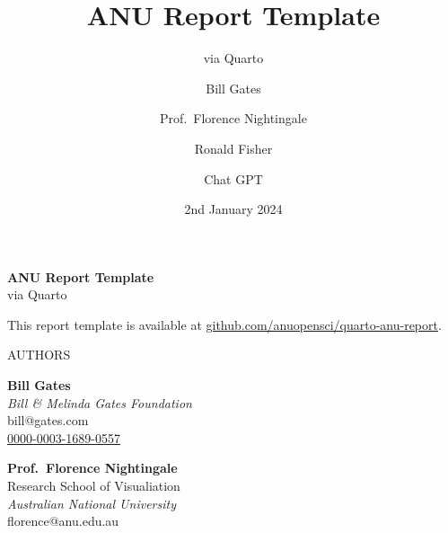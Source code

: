 \documentclass[
  a4paper,
  oneside,
  open=any]{scrbook}
\title{ANU Report Template}
\subtitle{via Quarto}
\author{Bill Gates \and Prof.~Florence Nightingale \and Ronald
Fisher \and Chat GPT}
\date{2nd January 2024}
\newcommand{\orcid}[1]{\href{https://orcid.org/#1}{\textcolor{orcidlogocol}{\faOrcid} #1}}
\begin{document}
  \begin{frontmatter}
  \begin{titlepage}

  \begin{minipage}[b][\textheight][s]{\textwidth}
  \raggedright


  {\Huge\bfseries{ANU Report Template}}\\[1\baselineskip]
  {\LARGE{via Quarto}}\\[1\baselineskip]
    \vspace{3mm}

      This report template is available at
      \href{https://github.com/anuopensci/quarto-anu-report}{github.com/anuopensci/quarto-anu-report}.

  \begin{titlepagebox}



  \textcolor{anugold}{\MakeUppercase{Authors}}
  \vspace{-3mm}
  \begin{multicols}{2}
      \begin{minipage}{\columnwidth}
      \raggedright
      \normalfont
      {\textbf{Bill Gates}}\\
          
      {\itshape{Bill \& Melinda Gates Foundation}}\\
           bill@gates.com\\
      
      \orcid{0000-0003-1689-0557}\\
      \vspace{4mm}
      \end{minipage}

      \begin{minipage}{\columnwidth}
      \raggedright
      \normalfont
      {\textbf{Prof.~Florence Nightingale}}\\
          {Research School of Visualiation}\\
      {\itshape{Australian National University}}\\
           florence@anu.edu.au\\
      

\end{minipage}
\end{multicols}
\end{titlepagebox}
\end{minipage}
\end{titlepage}
\end{frontmatter}
\end{document}
